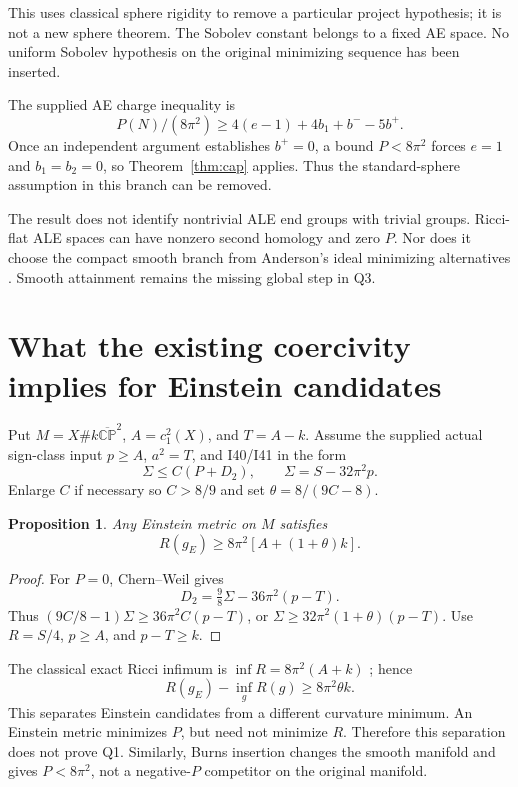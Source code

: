 \documentclass[11pt,a4paper]{article}
\newtheorem{proposition}[theorem]{Proposition}
\theoremstyle{remark}\newtheorem{remark}[theorem]{Remark}
\newcommand{\CP}{\mathbb{CP}}
\begin{document}
This uses classical sphere rigidity to remove a particular project hypothesis; it is not a new sphere theorem. The Sobolev constant belongs to a fixed AE space. No uniform Sobolev hypothesis on the original minimizing sequence has been inserted.

The supplied AE charge inequality is
\[
 P(N)/(8\pi^2)\ge4(e-1)+4b_1+b^--5b^+.
\]
Once an independent argument establishes $b^+=0$, a bound $P<8\pi^2$ forces $e=1$ and $b_1=b_2=0$, so Theorem~\ref{thm:cap} applies. Thus the standard-sphere assumption in this branch can be removed.

The result does not identify nontrivial ALE end groups with trivial groups. Ricci-flat ALE spaces can have nonzero second homology and zero $P$. Nor does it choose the compact smooth branch from Anderson's ideal minimizing alternatives \cite{Anderson}. Smooth attainment remains the missing global step in Q3.

\section{What the existing coercivity implies for Einstein candidates}
Put $M=X\#k\overline{\CP}^2$, $A=c_1^2(X)$, and $T=A-k$.
Assume the supplied actual sign-class input $p\ge A$, $a^2=T$, and I40/I41 in the form
\[
 \Sigma\le C(P+D_2),\qquad \Sigma=S-32\pi^2p.
\]
Enlarge $C$ if necessary so $C>8/9$ and set $\theta=8/(9C-8)$.
\begin{proposition}
Any Einstein metric on $M$ satisfies
\[
 R(g_E)\ge8\pi^2[A+(1+\theta)k].
\]
\end{proposition}
\begin{proof}
For $P=0$, Chern--Weil gives
\[
 D_2=\tfrac98\Sigma-36\pi^2(p-T).
\]
Thus $(9C/8-1)\Sigma\ge36\pi^2C(p-T)$, or
$\Sigma\ge32\pi^2(1+\theta)(p-T)$.
Use $R=S/4$, $p\ge A$, and $p-T\ge k$.
\end{proof}
The classical exact Ricci infimum is $\inf R=8\pi^2(A+k)$ \cite{LeBrunRicci}; hence
\[
 R(g_E)-\inf_gR(g)\ge8\pi^2\theta k.
\]
This separates Einstein candidates from a different curvature minimum. An Einstein metric minimizes $P$, but need not minimize $R$. Therefore this separation does not prove Q1. Similarly, Burns insertion changes the smooth manifold and gives $P<8\pi^2$, not a negative-$P$ competitor on the original manifold.
\end{document}
